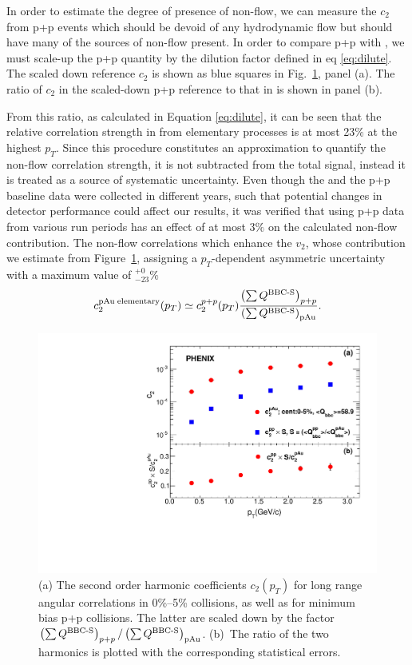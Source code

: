 In order to estimate the degree of presence of non-flow, we can measure the $c_2$ from p+p events which should be devoid of any hydrodynamic flow but should have many of the sources of non-flow present. In order to compare p+p with \pau, we must scale-up the p+p quantity by the dilution factor defined in eq \ref{eq:dilute}.
The scaled down reference $c_{2}$ is shown as blue squares in Fig.~\ref{fig:non_flow}, panel (a). The ratio of $c_2$ in the scaled-down p+p reference to that in \pau is shown in panel (b). 

From this ratio, as calculated in Equation \ref{eq:dilute}, it can be seen that the relative correlation strength in \pau from elementary processes is at most 23$\%$ at the highest $p_T$. Since this procedure constitutes an approximation to quantify the non-flow correlation strength, it is not subtracted from the total signal, instead it is treated as a source of systematic uncertainty. Even though the \pau and the p+p baseline data were collected in different years, such that potential changes in detector performance could affect our results, it was verified that using p+p data from various run periods has an effect of at most 3$\%$ on the calculated non-flow contribution. The non-flow correlations which enhance the $v_2$, whose contribution we estimate from Figure~\ref{fig:non_flow}, assigning a $p_T$-dependent asymmetric uncertainty with a maximum value of $^{+0}_{-23}\%$
\begin{equation}
c_{2}^{{\rm pAu \; elementary}}(p_{T}) \simeq c_{2}^{p+p}(p_{T})
\frac{\left( \sum Q^{{\rm \text{BBC-S}}} \right)_{p+p}}
{\left( \sum Q^{{\rm \text{BBC-S}}} \right)_{{\rm pAu}}}.
\label{eq:dilute}
\end{equation}

\begin{figure}[!h]
\begin{center}
\includegraphics[width=0.6\linewidth]{figs/non_flow.pdf}
\caption{(a) The second order harmonic coefficients $c_2(p_T)$ for long range angular correlations in
0\%--5\% \pau collisions, as well as for minimum bias p+p collisions. The latter are scaled down by the factor $\left( \sum Q^{{\rm \text{BBC-S}}} \right)_{p+p} / \left( \sum Q^{{\rm
\text{BBC-S}}} \right)_{{\rm pAu}}$. (b)~The
ratio of the two harmonics is plotted with the corresponding statistical errors.}
\label{fig:non_flow}
\end{center}
\end{figure}

